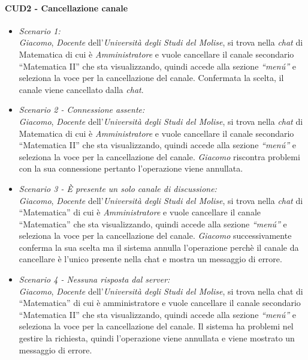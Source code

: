\paragraph{CUD2 - Cancellazione canale\\}
\begin{itemize}
	\item \textit{Scenario 1:\\}
	\textit{Giacomo}, \textit{Docente} dell’\textit{Università degli Studi del Molise}, si trova nella \textit{chat} di Matematica di cui è \textit{Amministratore} e vuole cancellare il canale secondario  “Matematica II” che sta visualizzando, quindi accede alla sezione \textit{“menú”} e seleziona la voce per la cancellazione del canale. Confermata la scelta, il canale viene cancellato dalla \textit{chat}.\\
	
	\item \textit{Scenario 2 - Connessione assente:\\}
	\textit{Giacomo}, \textit{Docente} dell’\textit{Università degli Studi del Molise}, si trova nella \textit{chat} di Matematica di cui è \textit{Amministratore} e vuole cancellare il canale secondario  “Matematica II” che sta visualizzando, quindi accede alla sezione \textit{“menú”}  e seleziona la voce per la cancellazione del canale. \textit{Giacomo} riscontra problemi con la sua connessione pertanto l’operazione viene annullata.\\
	
	\item \textit{Scenario 3 - È presente un solo canale di discussione:\\}
	\textit{Giacomo}, \textit{Docente} dell’\textit{Università degli Studi del Molise}, si trova nella \textit{chat} di “Matematica” di cui è \textit{Amministratore} e vuole cancellare il canale “Matematica” che sta visualizzando, quindi accede alla sezione \textit{“menú”} e seleziona la voce per la cancellazione del canale. \textit{Giacomo} successivamente conferma la sua scelta ma il sistema annulla l’operazione perchè il canale da cancellare è l’unico presente nella chat e mostra un messaggio di errore.\\
	
	\item \textit{Scenario 4 - Nessuna risposta dal server:\\}
	\textit{Giacomo}, \textit{Docente} dell’\textit{Università degli Studi del Molise}, si trova nella chat di “Matematica” di cui è amministratore e vuole cancellare il canale secondario  “Matematica II” che sta visualizzando, quindi accede alla sezione \textit{“menú”} e seleziona la voce per la cancellazione del canale. Il sistema ha problemi nel gestire la richiesta, quindi l’operazione viene annullata e viene mostrato un messaggio di errore.\\
\end{itemize}

